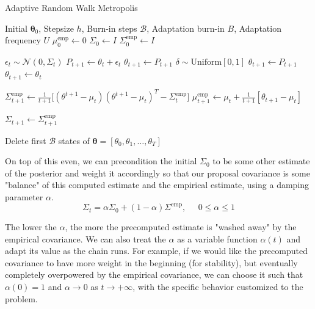   \begin{algorithm}
    \caption{Adaptive Random Walk Metropolis}\label{alg:adaptive_metro}
    \begin{algorithmic}

    \Require Initial $\boldsymbol{\theta}_0$, Stepsize $h$, Burn-in steps $\mathcal{B}$, Adaptation burn-in $B$, Adaptation frequency $U$
    \State $\mu_0^\mathrm{emp} \gets 0$ 
    \State $\Sigma_0 \gets I$
    \State $\Sigma^\mathrm{emp}_0 \gets I$

        \State $\epsilon_t \sim \mathcal{N}(0, \Sigma_t)$ 
        \State $P_{t+1} \gets \theta_t + \epsilon_t$
            \State $\theta_{t+1} \gets P_{t+1}$ 
        \Else
            \State $\delta \sim \mathrm{Uniform}[0, 1]$
                \State $\theta_{t+1} \gets P_{t+1}$ 
            \Else 
                \State $\theta_{t+1} \gets \theta_t$
            \EndIf
        \EndIf
        
        \State $\Sigma^\mathrm{emp}_{t+1} \gets \frac{1}{t+1} \big[(\theta^{t+1} - \mu_t) (\theta^{t+1} - \mu_t)^T - \Sigma^\mathrm{emp}_t \big]$
        \State $\mu_{t+1}^{\mathrm{emp}} \gets \mu_t + \frac{1}{t+1} [ \theta_{t+1} - \mu_t ]$
        
            \State $\Sigma_{t+1} \gets \Sigma^\mathrm{emp}_{t+1}$
        \EndIf
    \EndFor

    \State Delete first $\mathcal{B}$ states of $\boldsymbol{\theta} = [\theta_0, \theta_1, \ldots, \theta_T]$

    \end{algorithmic}
  \end{algorithm}

  On top of this even, we can precondition the initial $\Sigma_0$ to be some other estimate of the posterior and weight it accordingly so that our proposal covariance is some "balance" of this computed estimate and the empirical estimate, using a damping parameter $\alpha$. 
  \begin{equation}
    \Sigma_t = \alpha \Sigma_0 + (1 - \alpha) \Sigma^{\mathrm{emp}}, \;\;\;\;\; 0 \leq \alpha \leq 1
  \end{equation}

  The lower the $\alpha$, the more the precomputed estimate is "washed away" by the empirical covariance. We can also treat the $\alpha$ as a variable function $\alpha(t)$ and adapt its value as the chain runs. For example, if we would like the precomputed covariance to have more weight in the beginning (for stability), but eventually completely overpowered by the empirical covariance, we can choose it such that $\alpha(0) = 1$ and $\alpha \rightarrow 0$ as $t \rightarrow +\infty$, with the specific behavior customized to the problem. 

